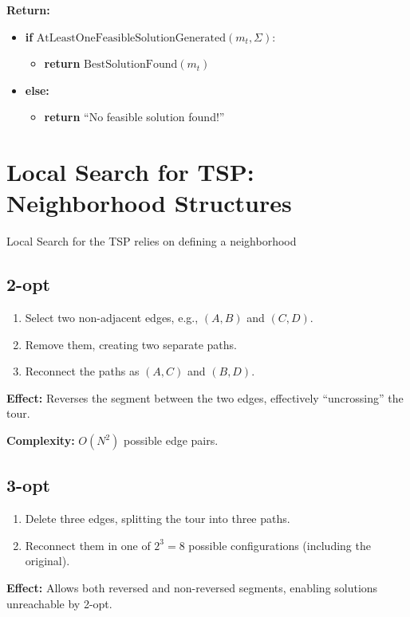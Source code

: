 \begin{tcolorbox}[colback=white, colframe=black!25, title={\textbf{Procedure:} LocalSearch\_SearchByIterativeSolutionModification($\pi$)}]
\vspace{0.7em}
\textbf{Return:}
\begin{itemize}[noitemsep, leftmargin=2em]
    \item \textbf{if} $\text{AtLeastOneFeasibleSolutionGenerated}(m_t, \Sigma)$:
    \begin{itemize}[noitemsep, leftmargin=2em]
        \item \textbf{return} $\text{BestSolutionFound}(m_t)$
    \end{itemize}
    \item \textbf{else:}
    \begin{itemize}[noitemsep, leftmargin=2em]
        \item \textbf{return} ``No feasible solution found!''
    \end{itemize}
\end{itemize}

\end{tcolorbox}

\section*{Local Search for TSP: Neighborhood Structures}

Local Search for the TSP relies on defining a neighborhood

\subsection*{2-opt}
\begin{enumerate}
    \item Select two non-adjacent edges, e.g., $(A,B)$ and $(C,D)$.
    \item Remove them, creating two separate paths.
    \item Reconnect the paths as $(A,C)$ and $(B,D)$.
\end{enumerate}
\textbf{Effect:} Reverses the segment between the two edges, effectively ``uncrossing'' the tour.  

\textbf{Complexity:} $O(N^2)$ possible edge pairs.

\subsection*{3-opt}
\begin{enumerate}
    \item Delete three edges, splitting the tour into three paths.
    \item Reconnect them in one of $2^3 = 8$ possible configurations (including the original).
\end{enumerate}
\textbf{Effect:} Allows both reversed and non-reversed segments, enabling solutions unreachable by 2-opt.  

